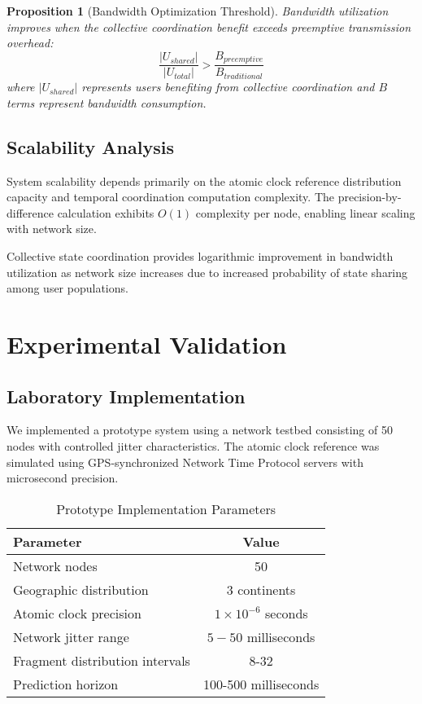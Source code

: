\documentclass[12pt,a4paper]{article}
\newtheorem{proposition}{Proposition}
\begin{document}
\begin{proposition}[Bandwidth Optimization Threshold]
Bandwidth utilization improves when the collective coordination benefit exceeds preemptive transmission overhead:
\begin{equation}
\frac{|U_{shared}|}{|U_{total}|} > \frac{B_{preemptive}}{B_{traditional}}
\end{equation}
where $|U_{shared}|$ represents users benefiting from collective coordination and $B$ terms represent bandwidth consumption.
\end{proposition}

\subsection{Scalability Analysis}

System scalability depends primarily on the atomic clock reference distribution capacity and temporal coordination computation complexity. The precision-by-difference calculation exhibits $O(1)$ complexity per node, enabling linear scaling with network size.

Collective state coordination provides logarithmic improvement in bandwidth utilization as network size increases due to increased probability of state sharing among user populations.

\section{Experimental Validation}

\subsection{Laboratory Implementation}

We implemented a prototype system using a network testbed consisting of 50 nodes with controlled jitter characteristics. The atomic clock reference was simulated using GPS-synchronized Network Time Protocol servers with microsecond precision.

\begin{table}[htbp]
\centering
\caption{Prototype Implementation Parameters}
\begin{tabular}{@{}lc@{}}
\toprule
\textbf{Parameter} & \textbf{Value} \\
\midrule
Network nodes & 50 \\
Geographic distribution & 3 continents \\
Atomic clock precision & $1 \times 10^{-6}$ seconds \\
Network jitter range & $5-50$ milliseconds \\
Fragment distribution intervals & 8-32 \\
Prediction horizon & 100-500 milliseconds \\
\bottomrule
\end{tabular}
\end{table}
\end{document}
